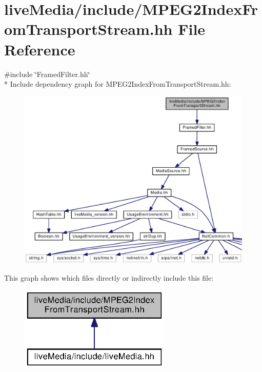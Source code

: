 \section{live\+Media/include/\+M\+P\+E\+G2\+Index\+From\+Transport\+Stream.hh File Reference}
\label{MPEG2IndexFromTransportStream_8hh}
{\ttfamily \#include \char`\"{}Framed\+Filter.\+hh\char`\"{}}\\*
Include dependency graph for M\+P\+E\+G2\+Index\+From\+Transport\+Stream.\+hh\+:
\nopagebreak
\begin{figure}[H]
\begin{center}
\leavevmode
\includegraphics[width=350pt]{MPEG2IndexFromTransportStream_8hh__incl}
\end{center}
\end{figure}
This graph shows which files directly or indirectly include this file\+:
\nopagebreak
\begin{figure}[H]
\begin{center}
\leavevmode
\includegraphics[width=204pt]{MPEG2IndexFromTransportStream_8hh__dep__incl}
\end{center}
\end{figure}
